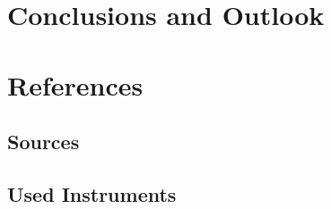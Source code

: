 \documentclass[12pt,a4paper,parskip=full,abstract=true,BCOR=12mm,twoside,open=right]{scrreprt}
\begin{document}

\chapter{Conclusions and Outlook}

\appendix
\chapter{References}
\section{Sources}
\label{sec:sources}
\section{Used Instruments}
\label{sec:instruments}
\end{document}
